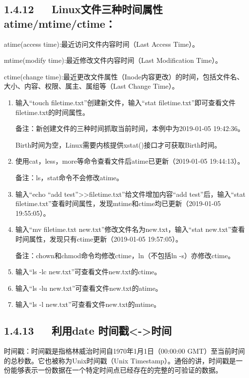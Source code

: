 \documentclass[letterpaper,12pt,english]{sphinxmanual}
\begin{document}
\subsection{1.4.12   Linux文件三种时间属性atime/mtime/ctime：}
\label{\detokenize{001software/001install/linux:linuxatime-mtime-ctime}}
atime(access time):最近访问文件内容时间（Last Access Time）。

mtime(modify time):最近修改文件内容时间（Last Modification Time）。

ctime(change time):最近更改文件属性（Inode内容更改）的时间，包括文件名、大小、内容、权限、属主、属组等（Last Change Time）。
\begin{enumerate}
%
\item {} 
输入“touch filetime.txt”创建新文件，输入“stat filetime.txt”即可查看文件filetime.txt的时间属性。

备注：新创建文件的三种时间抓取当前时间，本例中为2019-01-05 19:42:36。

Birth时间为空，Linux需要内核提供xstat()接口才可获取Birth时间。

\item {} 
使用cat，less，more等命令查看文件后atime已更新（2019-01-05 19:44:13）。

备注：ls，stat命令不会修改atime。

\item {} 
输入“echo “add test”\textgreater{}\textgreater{}filetime.txt”给文件增加内容“add test”后，输入“stat filetime.txt”查看时间属性，发现mtime和ctime均已更新（2019-01-05 19:55:05）。

\item {} 
输入“mv filetime.txt new.txt”修改文件名为new.txt，输入“stat new.txt”查看时间属性，发现只有ctime更新（2019-01-05 19:57:05）。

备注：chown和chmod命令均修改ctime，ln（不包括ln -s）亦修改ctime。

\item {} 
输入“ls -lc new.txt”可查看文件new.txt的ctime。

\item {} 
输入“ls -lu new.txt”可查看文件new.txt的atime。

\item {} 
输入“ls -l new.txt”可查看文件new.txt的mtime。

\end{enumerate}


\subsection{1.4.13   利用date 时间戳\textless{}-\textgreater{}时间}
\label{\detokenize{001software/001install/linux:id28}}
时间戳：时间戳是指格林威治时间自1970年1月1日（00:00:00 GMT）至当前时间的总秒数。它也被称为Unix时间戳（Unix Timestamp）。通俗的讲，时间戳是一份能够表示一份数据在一个特定时间点已经存在的完整的可验证的数据。
\end{document}
